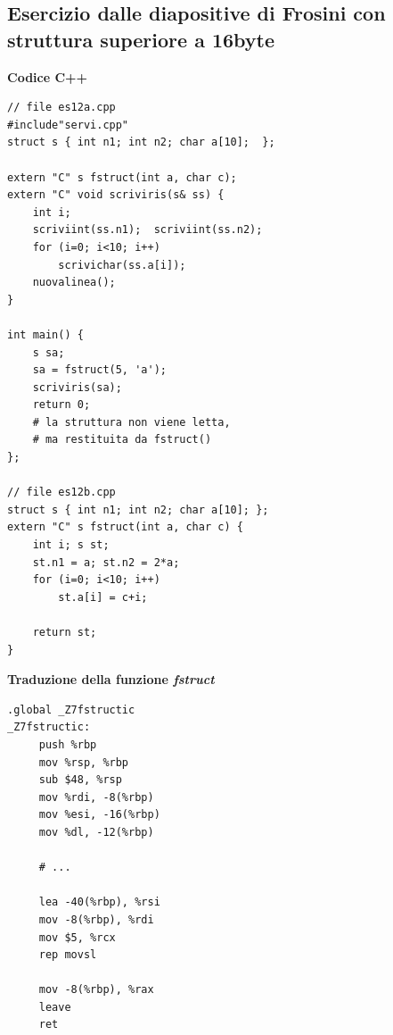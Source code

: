 \documentclass[11pt]{report}
\theoremstyle{definition}
\begin{document}
\subsection{Esercizio dalle diapositive di Frosini con struttura superiore a 16byte}
\begingroup
\small
\begin{framed}
\begin{multicols}{2}
\noindent \textbf{Codice C++}
\begin{verbatim}
// file es12a.cpp
#include"servi.cpp"
struct s { int n1; int n2; char a[10];  };

extern "C" s fstruct(int a, char c);
extern "C" void scriviris(s& ss) { 
    int i;
    scriviint(ss.n1);  scriviint(ss.n2);
    for (i=0; i<10; i++)
        scrivichar(ss.a[i]);
    nuovalinea();
}

int main() { 
    s sa;
    sa = fstruct(5, 'a');
    scriviris(sa);
    return 0;
    # la struttura non viene letta,
    # ma restituita da fstruct()
};

// file es12b.cpp
struct s { int n1; int n2; char a[10]; };
extern "C" s fstruct(int a, char c) { 
    int i; s st;
    st.n1 = a; st.n2 = 2*a;
    for (i=0; i<10; i++) 
        st.a[i] = c+i;
    
    return st;
}
\end{verbatim}
\end{multicols}
\end{framed}
\textbf{Traduzione della funzione \emph{fstruct}}
\begin{multicols}{2}
\begin{verbatim}
.global _Z7fstructic
_Z7fstructic: 
     push %rbp
     mov %rsp, %rbp
     sub $48, %rsp
     mov %rdi, -8(%rbp)
     mov %esi, -16(%rbp)
     mov %dl, -12(%rbp)
     
     # ...
       
     lea -40(%rbp), %rsi
     mov -8(%rbp), %rdi
     mov $5, %rcx
     rep movsl
     
     mov -8(%rbp), %rax
     leave 
     ret
\end{verbatim}
\end{multicols}
\end{document}
